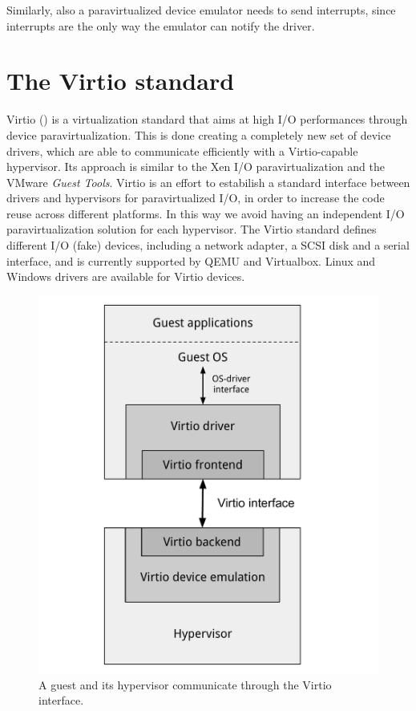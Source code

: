 Similarly, also a paravirtualized device emulator needs to send interrupts, since interrupts are the only way the emulator can notify
the driver.


\section{The Virtio standard}
Virtio (\cite{ref:virtio}) is a virtualization standard that aims at high I/O performances through device paravirtualization. This is done
creating a completely new set of device drivers, which are able to communicate efficiently with a Virtio-capable hypervisor. Its approach is
similar to the Xen I/O paravirtualization and the VMware \emph{Guest Tools}.
Virtio is an effort to estabilish a standard interface between drivers and hypervisors for paravirtualized I/O, in order to increase the 
code reuse across different platforms. In this way we avoid having an independent I/O paravirtualization solution for each hypervisor.
The Virtio standard defines different I/O (fake) devices, including a network adapter, a SCSI disk and a serial interface, and is currently
supported by QEMU and Virtualbox. Linux and Windows drivers are available for Virtio devices.

\begin{figure}[bt]
\centering
\includegraphics[scale = 0.45]{virtio.pdf}
\caption{A guest and its hypervisor communicate through the Virtio interface.}
\label{fig:virtio}
\end{figure}

